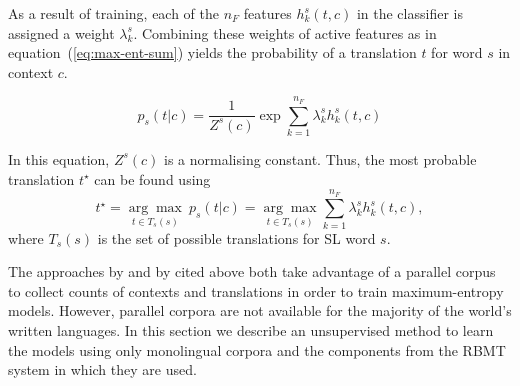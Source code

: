 \documentclass[11pt]{article}
\newcommand{\todomlf}[1]{\renewcommand{\baselinestretch}{0.55}\todo{\scriptsize\sf MLF: #1}\renewcommand{\baselinestretch}{1.0}}
\begin{document}
As a result of training, each of the \(n_F\) features \(h^s_k(t,c)\) in the classifier is assigned a
weight $\lambda_k^s$. Combining these weights of active features
as in equation~(\ref{eq:max-ent-sum}) yields the probability of a
translation $t$ for word $s$ in context $c$.

\begin{equation}
p_s(t|c) = \frac{1}{Z^s(c)} \exp{ \sum_{k=1}^{n_F} \lambda_k^s h_k^s(t, c)}
\label{eq:max-ent-sum}
\end{equation}

In this equation, $Z^s(c)$ is a normalising constant. Thus, the most
probable translation \(t^\star\) can be found using
\begin{equation}
  t^\star=\underset{t \in T_s(s)}{\arg\max} ~ p_s(t|c) = \underset{t \in T_s(s)}{\arg\max} \sum_{k=1}^{n_F} \lambda_k^s h_k^s(t, c) ,
\label{eq:max-ent-max}
\end{equation}
where $T_s(s)$ is the set of possible translations for SL word $s$.

The approaches by \cite{berger1996} and by \cite{marechek10} cited
above both take advantage of a parallel corpus to collect counts of
contexts and translations in order to train maximum-entropy
models. However, parallel corpora are not available for the majority
of the world's written languages. In this section we describe an
unsupervised method to learn the models using only monolingual corpora
and the components from the RBMT system in which they are
used. 
\end{document}
